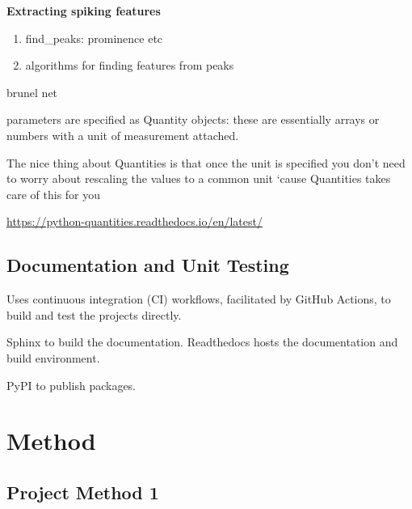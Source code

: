 \textbf{Extracting spiking features}

\begin{enumerate}
    \item find\_peaks: prominence etc 
    \item algorithms for finding features from peaks 
\end{enumerate} 

brunel net

parameters are specified as Quantity objects: these are essentially arrays or numbers with a unit of measurement attached.

The nice thing about Quantities is that once the unit is specified you don’t need to worry about rescaling the values to a common unit ‘cause Quantities takes care of this for you

\url{https://python-quantities.readthedocs.io/en/latest/}

\subsection{Documentation and Unit Testing}

Uses continuous integration (CI) workflows, facilitated by GitHub Actions, to build and test the projects directly.

Sphinx to build the documentation. Readthedocs hosts the documentation and build environment. 

PyPI to publish packages. 

\section{Method}\label{sec:Method}

\subsection{Project Method 1}\label{sec:project method}

